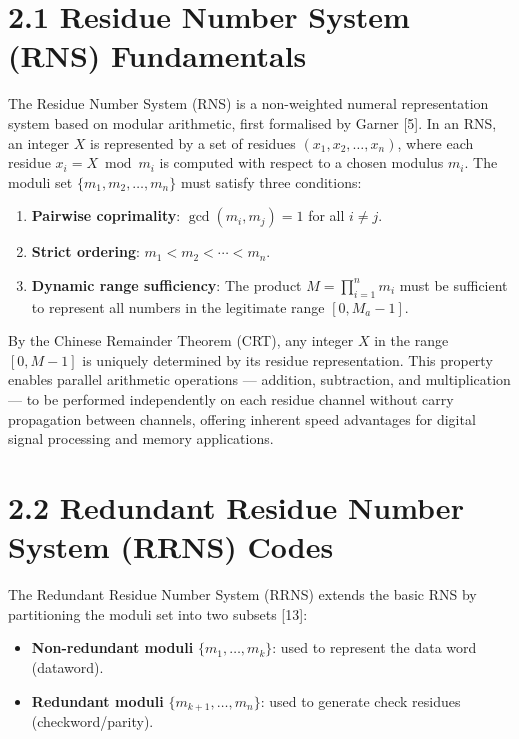 \documentclass[
  12pt,
  a4paper]{report}
\providecommand{\tightlist}{%
  \setlength{\itemsep}{0pt}\setlength{\parskip}{0pt}}
\begin{document}
\section{2.1 Residue Number System (RNS)
Fundamentals}\label{residue-number-system-rns-fundamentals}

The Residue Number System (RNS) is a non-weighted numeral representation
system based on modular arithmetic, first formalised by Garner {[}5{]}.
In an RNS, an integer \(X\) is represented by a set of residues
\((x_1, x_2, \ldots, x_n)\), where each residue \(x_i = X \bmod m_i\) is
computed with respect to a chosen modulus \(m_i\). The moduli set
\(\{m_1, m_2, \ldots, m_n\}\) must satisfy three conditions:

\begin{enumerate}
\def\labelenumi{\arabic{enumi}.}
\tightlist
\item
  \textbf{Pairwise coprimality}: \(\gcd(m_i, m_j) = 1\) for all
  \(i \neq j\).
\item
  \textbf{Strict ordering}: \(m_1 < m_2 < \cdots < m_n\).
\item
  \textbf{Dynamic range sufficiency}: The product
  \(M = \prod_{i=1}^{n} m_i\) must be sufficient to represent all
  numbers in the legitimate range \([0, M_a - 1]\).
\end{enumerate}

By the Chinese Remainder Theorem (CRT), any integer \(X\) in the range
\([0, M-1]\) is uniquely determined by its residue representation. This
property enables parallel arithmetic operations --- addition,
subtraction, and multiplication --- to be performed independently on
each residue channel without carry propagation between channels,
offering inherent speed advantages for digital signal processing and
memory applications.

\section{2.2 Redundant Residue Number System (RRNS)
Codes}\label{redundant-residue-number-system-rrns-codes}

The Redundant Residue Number System (RRNS) extends the basic RNS by
partitioning the moduli set into two subsets {[}13{]}:

\begin{itemize}
\tightlist
\item
  \textbf{Non-redundant moduli} \(\{m_1, \ldots, m_k\}\): used to
  represent the data word (dataword).
\item
  \textbf{Redundant moduli} \(\{m_{k+1}, \ldots, m_n\}\): used to
  generate check residues (checkword/parity).
\end{itemize}
\end{document}
